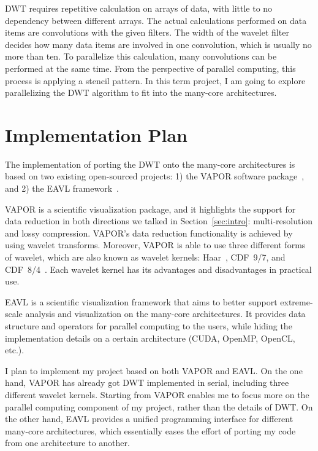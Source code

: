 \documentclass{article}
\begin{document}
DWT requires repetitive calculation on arrays of data, with little to no
dependency between different arrays.
%
The actual calculations performed on data items are convolutions
with the given filters. 
%
The width of the wavelet filter decides how many data items are 
involved in one convolution, which is usually no more than ten.
%
To parallelize this calculation, many convolutions can be performed
at the same time.
%
From the perspective of parallel computing, this process is applying
a stencil pattern.
%
%
In this term project, I am going to explore parallelizing the DWT algorithm 
to fit into the many-core architectures.


\section{Implementation Plan}
The implementation of porting the DWT onto the many-core architectures
is based on two existing open-sourced projects: 1) the VAPOR software 
package~\cite{clyne2007interactive},
and 2) the EAVL framework~\cite{meredith2012distributed}.

VAPOR is a scientific visualization package, and it highlights the 
support for data reduction in both directions we talked in
Section~\ref{sec:intro}: multi-resolution and lossy compression.
%
VAPOR's data reduction functionality is achieved by using wavelet transforms.
%
Moreover, VAPOR is able to use three different forms of wavelet, which 
are also known as wavelet kernels: Haar~\cite{haar1910theorie}, 
CDF~9/7, and CDF~8/4~\cite{cohen1992biorthogonal}.
%
Each wavelet kernel has its advantages and disadvantages in practical use.

EAVL is a scientific visualization framework that aims to better support
extreme-scale analysis and visualization on the many-core architectures.
%
It provides data structure and operators for parallel computing to the 
users, while hiding the implementation details on a certain architecture
(CUDA, OpenMP, OpenCL, etc.).

I plan to implement my project based on both VAPOR and EAVL. 
%
On the one hand, VAPOR has already got DWT implemented in serial, 
including three different wavelet kernels.
%
Starting from VAPOR enables me to focus more on the parallel computing 
component of my project, rather than the details of DWT.
%
On the other hand, EAVL provides a unified programming interface for 
different many-core architectures, which essentially eases the effort
of porting my code from one architecture to another.
\end{document}
